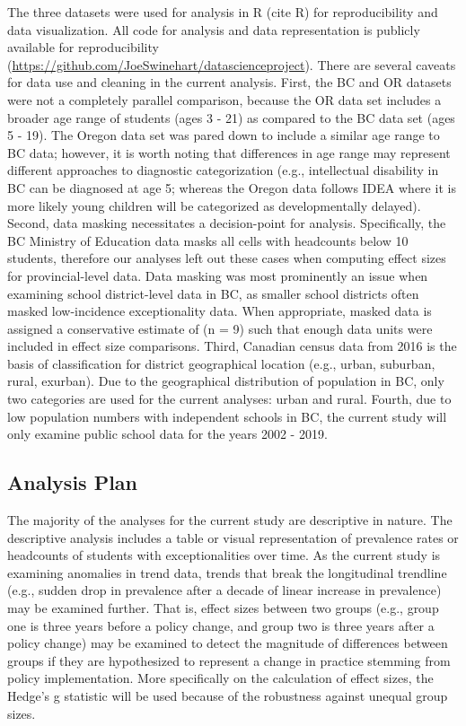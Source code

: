\documentclass[
  english,
  man,floatsintext]{apa6}
\begin{document}
The three datasets were used for analysis in R (cite R) for reproducibility and data visualization. All code for analysis and data representation is publicly available for reproducibility (\url{https://github.com/JoeSwinehart/datascienceproject}). There are several caveats for data use and cleaning in the current analysis. First, the BC and OR datasets were not a completely parallel comparison, because the OR data set includes a broader age range of students (ages 3 - 21) as compared to the BC data set (ages 5 - 19). The Oregon data set was pared down to include a similar age range to BC data; however, it is worth noting that differences in age range may represent different approaches to diagnostic categorization (e.g., intellectual disability in BC can be diagnosed at age 5; whereas the Oregon data follows IDEA where it is more likely young children will be categorized as developmentally delayed). Second, data masking necessitates a decision-point for analysis. Specifically, the BC Ministry of Education data masks all cells with headcounts below 10 students, therefore our analyses left out these cases when computing effect sizes for provincial-level data. Data masking was most prominently an issue when examining school district-level data in BC, as smaller school districts often masked low-incidence exceptionality data. When appropriate, masked data is assigned a conservative estimate of (n = 9) such that enough data units were included in effect size comparisons. Third, Canadian census data from 2016 is the basis of classification for district geographical location (e.g., urban, suburban, rural, exurban). Due to the geographical distribution of population in BC, only two categories are used for the current analyses: urban and rural. Fourth, due to low population numbers with independent schools in BC, the current study will only examine public school data for the years 2002 - 2019.

\hypertarget{analysis-plan}{%
\subsection{Analysis Plan}\label{analysis-plan}}

The majority of the analyses for the current study are descriptive in nature. The descriptive analysis includes a table or visual representation of prevalence rates or headcounts of students with exceptionalities over time. As the current study is examining anomalies in trend data, trends that break the longitudinal trendline (e.g., sudden drop in prevalence after a decade of linear increase in prevalence) may be examined further. That is, effect sizes between two groups (e.g., group one is three years before a policy change, and group two is three years after a policy change) may be examined to detect the magnitude of differences between groups if they are hypothesized to represent a change in practice stemming from policy implementation. More specifically on the calculation of effect sizes, the Hedge's g statistic will be used because of the robustness against unequal group sizes.
\end{document}
